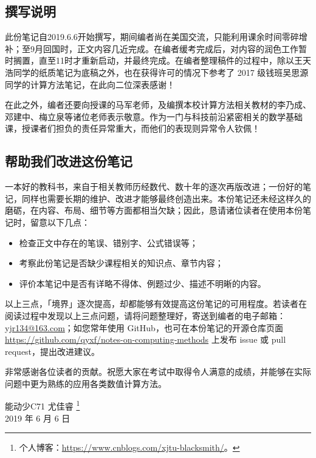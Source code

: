 \documentclass[opensource,b5paper,sourcefont]{qyxf-book}
\newcommand{\tl}{\setlength{\itemsep}{0pt}\setlength{\parskip}{0pt}}
\begin{document}
\subsection*{撰写说明}
此份笔记自2019.6.6开始撰写，期间编者尚在美国交流，只能利用课余时间零碎增补；至9月回国时，正文内容几近完成。在编者缓考完成后，对内容的润色工作暂时搁置，直至11时才重新启动，并最终完成。在编者整理稿件的过程中，除以王天浩同学的纸质笔记为底稿之外，也在获得许可的情况下参考了 2017 级钱班吴思源同学的计算方法笔记，在此向二位深表感谢！

在此之外，编者还要向授课的马军老师，及编撰本校计算方法相关教材的李乃成、邓建中、梅立泉等诸位老师表示敬意。作为一门与科技前沿紧密相关的数学基础课，授课者们担负的责任异常重大，而他们的表现则异常令人钦佩！

\subsection*{帮助我们改进这份笔记}
一本好的教科书，来自于相关教师历经数代、数十年的逐次再版改进；一份好的笔记，同样也需要长期的维护、改进才能够最终创造出来。本份笔记还未经这样久的磨砺，在内容、布局、细节等方面都相当欠缺；因此，恳请诸位读者在使用本份笔记时，留意以下几点：

\begin{itemize}\tl
    \item 检查正文中存在的笔误、错别字、公式错误等；
    \item 考察此份笔记是否缺少课程相关的知识点、章节内容；
    \item 评价本笔记中是否有详略不得体、例题过少、描述不明晰的内容。
\end{itemize}

以上三点，「境界」逐次提高，却都能够有效提高这份笔记的可用程度。若读者在阅读过程中发现以上三点问题，请将问题整理好，寄送到编者的电子邮箱：\url{yjr134@163.com}；如您常年使用 GitHub，也可在本份笔记的开源仓库页面 \url{https://github.com/qyxf/notes-on-computing-methods} 上发布 issue 或 pull request，提出改进建议。

非常感谢各位读者的贡献。祝愿大家在考试中取得令人满意的成绩，并能够在实际问题中更为熟练的应用各类数值计算方法。

\begin{flushright}
能动少C71 尤佳睿
\footnote{个人博客：\url{https://www.cnblogs.com/xjtu-blacksmith/}。}
\\2019 年 6 月 6 日
\end{flushright}
\cleardoublepage

\tableofcontents
\end{document}
